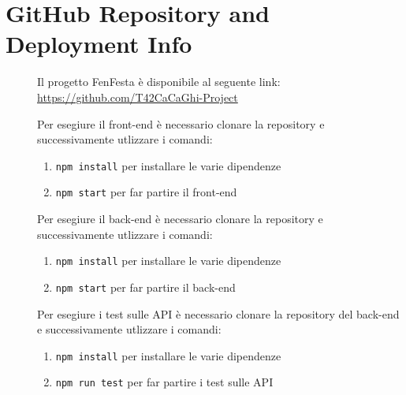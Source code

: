 \documentclass{article}
\begin{document}
\section{GitHub Repository and Deployment Info}
\begin{description}
    \item[] Il progetto FenFesta è disponibile al seguente link: \url{https://github.com/T42CaCaGhi-Project}
    \item[] Per esegiure il front-end è necessario clonare la repository e successivamente utlizzare i comandi:
        \begin{enumerate}
            \item \texttt{npm install} per installare le varie dipendenze
            \item \texttt{npm start} per far partire il front-end
        \end{enumerate}
    \item[] Per esegiure il back-end è necessario clonare la repository e successivamente utlizzare i comandi:
        \begin{enumerate}
            \item \texttt{npm install} per installare le varie dipendenze
            \item \texttt{npm start} per far partire il back-end
        \end{enumerate}
    \item[] Per esegiure i test sulle API è necessario clonare la repository del back-end e successivamente utlizzare i comandi:
        \begin{enumerate}
            \item \texttt{npm install} per installare le varie dipendenze
            \item \texttt{npm run test} per far partire i test sulle API
        \end{enumerate}
\end{description}
\clearpage
\end{document}

